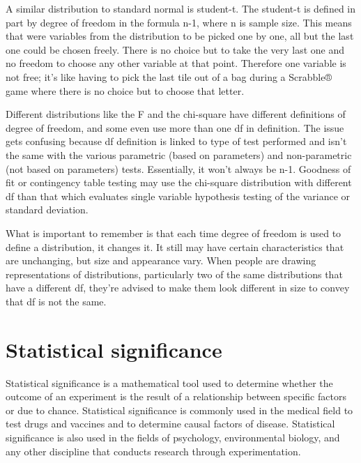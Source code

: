  

A similar distribution to standard normal is student-t. The student-t is defined in part by degree of freedom in the formula n-1, where n is sample size. This means that were variables from the distribution to be picked one by one, all but the last one could be chosen freely. There is no choice but to take the very last one and no freedom to choose any other variable at that point. Therefore one variable is not free; it’s like having to pick the last tile out of a bag during a Scrabble® game where there is no choice but to choose that letter.

 

Different distributions like the F and the chi-square have different definitions of degree of freedom, and some even use more than one df in definition. The issue gets confusing because df definition is linked to type of test performed and isn’t the same with the various parametric (based on parameters) and non-parametric (not based on parameters) tests. Essentially, it won’t always be n-1. Goodness of fit or contingency table testing may use the chi-square distribution with different df than that which evaluates single variable hypothesis testing of the variance or standard deviation.

 

What is important to remember is that each time degree of freedom is used to define a distribution, it changes it. It still may have certain characteristics that are unchanging, but size and appearance vary. When people are drawing representations of distributions, particularly two of the same distributions that have a different df, they’re advised to make them look different in size to convey that df is not the same.

 





\section{Statistical significance}

 

Statistical significance is a mathematical tool used to determine whether the outcome of an experiment is the result of a relationship between specific factors or due to chance. Statistical significance is commonly used in the medical field to test drugs and vaccines and to determine causal factors of disease. Statistical significance is also used in the fields of psychology, environmental biology, and any other discipline that conducts research through experimentation.

